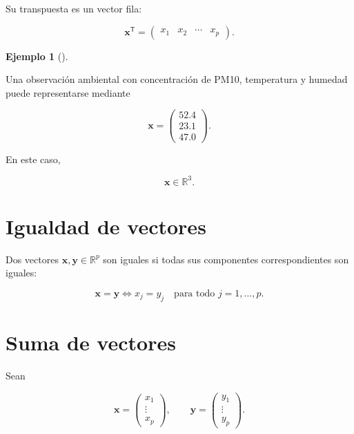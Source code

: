 \documentclass[
  spanish,
  10.5pt,
  letterpaper,
  DIV=11,
  numbers=noendperiod,
  oneside,
  open=any]{scrreprt}
\theoremstyle{definition}
\theoremstyle{definition}
\newtheorem{example}{Ejemplo}[chapter]
\theoremstyle{plain}
\theoremstyle{remark}
\begin{document}
Su transpuesta es un vector fila:

\[
\mathbf{x}^{\mathsf T}
=
\begin{pmatrix}
x_1 & x_2 & \cdots & x_p
\end{pmatrix}.
\]

\begin{example}[]\protect\hypertarget{exm-vector-observacion}{}\label{exm-vector-observacion}

Una observación ambiental con concentración de PM10, temperatura y
humedad puede representarse mediante

\[
\mathbf{x}
=
\begin{pmatrix}
52.4\\
23.1\\
47.0
\end{pmatrix}.
\]

En este caso,

\[
\mathbf{x}\in\mathbb{R}^{3}.
\]

\end{example}

\section*{Igualdad de vectores}\label{igualdad-de-vectores}


Dos vectores \(\mathbf{x},\mathbf{y}\in\mathbb{R}^{p}\) son iguales si
todas sus componentes correspondientes son iguales:

\[
\mathbf{x}=\mathbf{y}
\iff
x_j=y_j
\quad
\text{para todo }j=1,\ldots,p.
\]

\section*{Suma de vectores}\label{suma-de-vectores}


Sean

\[
\mathbf{x}
=
\begin{pmatrix}
x_1\\
\vdots\\
x_p
\end{pmatrix},
\qquad
\mathbf{y}
=
\begin{pmatrix}
y_1\\
\vdots\\
y_p
\end{pmatrix}.
\]
\end{document}

